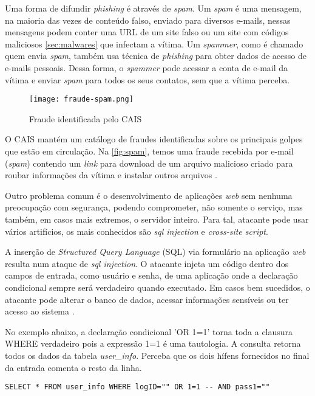 Uma forma de difundir \textit{phishing} é através de \textit{spam}. Um \textit{spam} é uma mensagem, na maioria das vezes de conteúdo falso, enviado para diversos e-mails, nessas mensagens podem conter uma URL de um site falso ou um site com códigos maliciosos \autoref{sec:malwares} que infectam a vítima. Um \textit{spammer}, como é chamado quem envia \textit{spam}, também usa técnica de \textit{phishing} para obter dados de acesso de e-mails pessoais. Dessa forma, o \textit{spammer} pode acessar a conta de e-mail da vítima e enviar \textit{spam} para todos os seus contatos, sem que a vítima perceba.

\begin{figure}[htb]
 \centering
 \caption{Fraude identificada pelo CAIS}
 \texttt{[image: fraude-spam.png]}
 \label{fig:spam}
\end{figure}

O CAIS mantém um catálogo de fraudes identificadas sobre os principais golpes que estão em circulação. Na \autoref{fig:spam}, temos uma fraude recebida por e-mail (\textit{spam}) contendo um \textit{link} para download de um arquivo malicioso criado para roubar informações da vítima e instalar outros arquivos \cite{cais}.

Outro problema comum é o desenvolvimento de aplicações \textit{web} sem nenhuma preocupação com segurança, podendo comprometer, não somente o serviço, mas também, em casos mais extremos, o servidor inteiro. Para tal, atacante pode usar vários artifícios, os mais conhecidos são \textit{sql injection} e \textit{cross-site script}.

A inserção de \textit{Structured Query Language} (SQL) via formulário na aplicação \textit{web} resulta num ataque de \textit{sql injection}. O atacante injeta um código dentro dos campos de entrada, como usuário e senha, de uma aplicação onde a declaração condicional sempre será verdadeiro quando executado. Em casos bem sucedidos, o atacante pode alterar o banco de dados, acessar informações sensíveis ou ter acesso ao sistema \cite{sqlinjection:sankaran}.

No exemplo abaixo, a declaração condicional 'OR 1=1' torna toda a clausura WHERE verdadeiro pois a expressão 1=1 é uma tautologia. A consulta retorna todos os dados da tabela \textit{user\_info}. Perceba que os dois hífens fornecidos no final da entrada comenta o resto da linha.

\begin{lstlisting}[Language=SQL]
  SELECT * FROM user_info WHERE logID="" OR 1=1 -- AND pass1="" 
\end{lstlisting}

